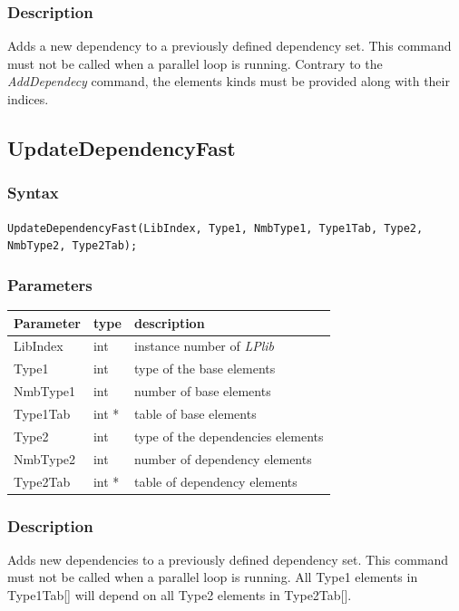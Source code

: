 \documentclass[a4paper,12pt]{article}
\begin{document}
\subsubsection*{Description}
Adds a new dependency to a previously defined dependency set. This command must not be called when a parallel loop is running. Contrary to the \emph{AddDependecy} command, the elements kinds must be provided along with their indices.


\subsection{UpdateDependencyFast}

\subsubsection*{Syntax}
\tt{UpdateDependencyFast(LibIndex, Type1, NmbType1, Type1Tab, Type2, NmbType2, Type2Tab);}
\normalfont

\subsubsection*{Parameters}
\begin{tabular}{|m{2cm}|m{1.5cm}|m{10.5cm}|}
\hline
Parameter  & type   & description \\
\hline
LibIndex   & int    & instance number of \emph{LPlib} \\
\hline
Type1      & int    & type of the base elements \\
\hline
NmbType1   & int    & number of base elements \\
\hline
Type1Tab   & int *  & table of base elements \\
\hline
Type2      & int    & type of the dependencies elements \\
\hline
NmbType2   & int    & number of dependency elements \\
\hline
Type2Tab   & int *  & table of dependency elements \\
\hline
\end{tabular}

\subsubsection*{Description}
Adds new dependencies to a previously defined dependency set. This command must not be called when a parallel loop is running. All Type1 elements in Type1Tab[] will depend on all Type2 elements in Type2Tab[].
\end{document}
